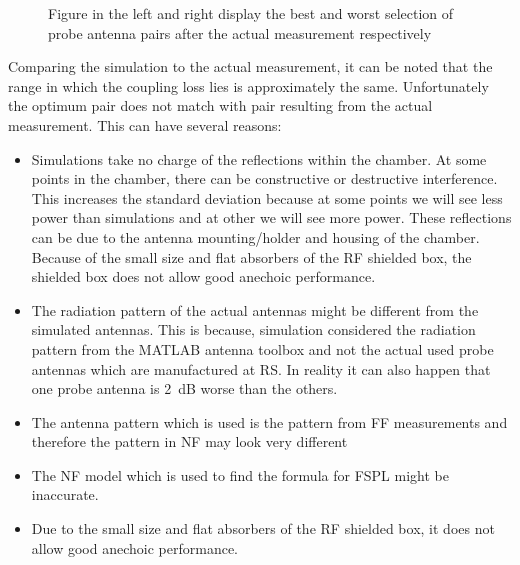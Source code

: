 \begin{figure}[H]
\caption{Figure in the left and right display the best and worst selection of probe antenna pairs after the actual measurement respectively}
\label{fig:man}
\end{figure}

Comparing the simulation to the actual measurement, it can be noted that the range in which the coupling loss lies is approximately the same. Unfortunately the optimum pair does not match with pair resulting from the actual measurement. This can have several reasons: 
\begin{itemize}
\item Simulations take no charge of the reflections within the chamber. At some points in the chamber, there can be constructive or destructive interference. This increases the standard deviation because at some points we will see less power than simulations and at other we will see more power. These reflections can be due to the antenna mounting/holder and housing of the chamber. Because of the small size and flat absorbers of the \acs{RF} shielded box, the shielded box does not allow good anechoic performance.
\item The radiation pattern of the actual antennas might be different from the simulated antennas. This is because, simulation considered the radiation pattern from the MATLAB\textregistered{} antenna toolbox and not the actual used probe antennas which are manufactured at \acs{RS}\textregistered{}. In reality it can also happen that one probe antenna is 2~dB worse than the others. 
\item The antenna pattern which is used is the pattern from \acf{FF} measurements and therefore the pattern in \acf{NF} may look very different
\item The \acf{NF} model which is used to find the formula for \acf{FSPL} might be inaccurate.
\item Due to the small size and flat absorbers of the RF shielded box, it does not allow good anechoic performance.
\end{itemize}



